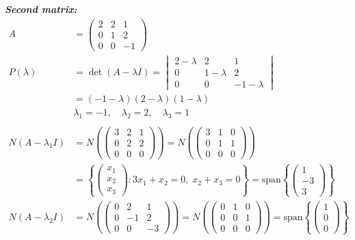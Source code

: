 \documentclass{article}
\begin{document}
\newpage
\noindent\textbf{\textit{Second matrix:}}
\begin{align*}
    A &= \begin{pmatrix} 2 & 2 & 1 \\ 0 & 1 & 2 \\ 0 & 0 & -1 \end{pmatrix} \\
    P(\lambda) &= \det(A - \lambda I) = \begin{vmatrix} 2 - \lambda & 2 & 1 \\ 0 & 1 - \lambda & 2 \\ 0 & 0 & -1 - \lambda \end{vmatrix} \\
    &= (-1 - \lambda)(2 - \lambda)(1 - \lambda)
    \\
    &\lambda_1 = -1, \quad \lambda_2 = 2, \quad \lambda_3 = 1 \\
    \\
    N(A - \lambda_1 I) &= N\left(\begin{pmatrix} 3 & 2 & 1 \\ 0 & 2 & 2 \\ 0 & 0 & 0 \end{pmatrix}\right) = N\left(\begin{pmatrix} 3 & 1 & 0 \\ 0 & 1 & 1 \\ 0 & 0 & 0 \end{pmatrix}\right) \\
    &= \left\{ \begin{pmatrix} x_1 \\ x_2 \\ x_3 \end{pmatrix} : 3x_1 + x_2 = 0, \; x_2 + x_3 = 0 \right\}
    = \text{span}\left\{ \begin{pmatrix} 1 \\ -3 \\ 3 \end{pmatrix} \right\} \\
    N(A - \lambda_2 I) &= N\left(\begin{pmatrix} 0 & 2 & 1 \\ 0 & -1 & 2 \\ 0 & 0 & -3 \end{pmatrix}\right) = N\left(\begin{pmatrix} 0 & 1 & 0 \\ 0 & 0 & 1 \\ 0 & 0 & 0 \end{pmatrix}\right)
    = \text{span}\left\{ \begin{pmatrix} 1 \\ 0 \\ 0 \end{pmatrix} \right\} \\

\end{align*}
\end{document}
